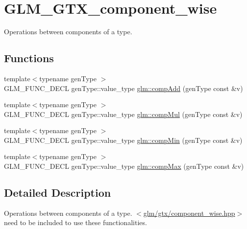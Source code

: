\hypertarget{group__gtx__component__wise}{\section{G\-L\-M\-\_\-\-G\-T\-X\-\_\-component\-\_\-wise}
\label{group__gtx__component__wise}
}


Operations between components of a type.  


\subsection*{Functions}
\begin{DoxyCompactItemize}
\item 
{\footnotesize template$<$typename gen\-Type $>$ }\\G\-L\-M\-\_\-\-F\-U\-N\-C\-\_\-\-D\-E\-C\-L gen\-Type\-::value\-\_\-type \hyperlink{group__gtx__component__wise_gaf71833350e15e74d31cbf8a3e7f27051}{glm\-::comp\-Add} (gen\-Type const \&v)
\item 
{\footnotesize template$<$typename gen\-Type $>$ }\\G\-L\-M\-\_\-\-F\-U\-N\-C\-\_\-\-D\-E\-C\-L gen\-Type\-::value\-\_\-type \hyperlink{group__gtx__component__wise_gae8ab88024197202c9479d33bdc5a8a5d}{glm\-::comp\-Mul} (gen\-Type const \&v)
\item 
{\footnotesize template$<$typename gen\-Type $>$ }\\G\-L\-M\-\_\-\-F\-U\-N\-C\-\_\-\-D\-E\-C\-L gen\-Type\-::value\-\_\-type \hyperlink{group__gtx__component__wise_gab5d0832b5c7bb01b8d7395973bfb1425}{glm\-::comp\-Min} (gen\-Type const \&v)
\item 
{\footnotesize template$<$typename gen\-Type $>$ }\\G\-L\-M\-\_\-\-F\-U\-N\-C\-\_\-\-D\-E\-C\-L gen\-Type\-::value\-\_\-type \hyperlink{group__gtx__component__wise_gabfa4bb19298c8c73d4217ba759c496b6}{glm\-::comp\-Max} (gen\-Type const \&v)
\end{DoxyCompactItemize}


\subsection{Detailed Description}
Operations between components of a type. $<$\hyperlink{component__wise_8hpp}{glm/gtx/component\-\_\-wise.\-hpp}$>$ need to be included to use these functionalities. 

